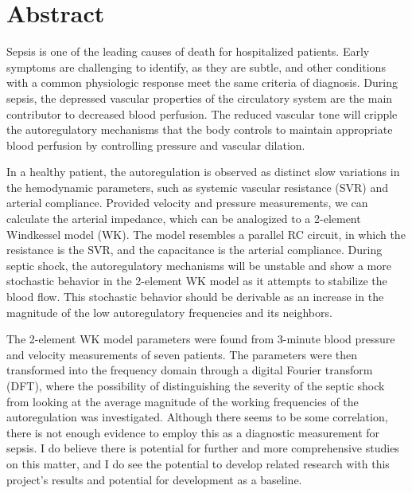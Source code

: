 
{\center \section*{Abstract}}


\noindent
Sepsis is one of the leading causes of death for hospitalized patients. Early symptoms are challenging to identify, as they are subtle, and other conditions with a common physiologic response meet the same criteria of diagnosis. During sepsis, the depressed vascular properties of the circulatory system are the main contributor to decreased blood perfusion. The reduced vascular tone will cripple the autoregulatory mechanisms that the body controls to maintain appropriate blood perfusion by controlling pressure and vascular dilation. 

In a healthy patient, the autoregulation is observed as distinct slow variations in the hemodynamic parameters, such as systemic vascular resistance (SVR) and arterial compliance. Provided velocity and pressure measurements, we can calculate the arterial impedance, which can be analogized to a 2-element Windkessel model (WK). The model resembles a parallel RC circuit, in which the resistance is the SVR, and the capacitance is the arterial compliance. During septic shock, the autoregulatory mechanisms will be unstable and show a more stochastic behavior in the 2-element WK model as it attempts to stabilize the blood flow. This stochastic behavior should be derivable as an increase in the magnitude of the low autoregulatory frequencies and its neighbors. 

The 2-element WK model parameters were found from 3-minute blood pressure and velocity measurements of seven patients. The parameters were then transformed into the frequency domain through a digital Fourier transform (DFT), where the possibility of distinguishing the severity of the septic shock from looking at the average magnitude of the working frequencies of the autoregulation was investigated. Although there seems to be some correlation, there is not enough evidence to employ this as a diagnostic measurement for sepsis. I do believe there is potential for further and more comprehensive studies on this matter, and I do see the potential to develop related research with this project's results and potential for development as a baseline.

\cleardoublepage